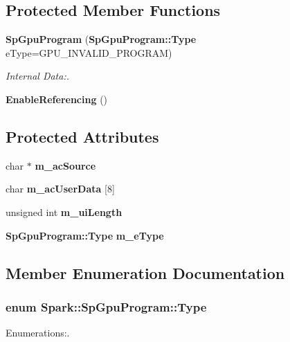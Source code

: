 \subsection*{Protected Member Functions}
\begin{CompactItemize}
\item 
{\bf Sp\-Gpu\-Program} ({\bf Sp\-Gpu\-Program::Type} e\-Type=GPU\_\-INVALID\_\-PROGRAM)
\begin{CompactList}\small\item\em Internal Data:. \item\end{CompactList}\item 
{\bf Enable\-Referencing} ()
\end{CompactItemize}
\subsection*{Protected Attributes}
\begin{CompactItemize}
\item 
char $\ast$ {\bf m\_\-ac\-Source}
\item 
char {\bf m\_\-ac\-User\-Data} [8]
\item 
unsigned int {\bf m\_\-ui\-Length}
\item 
{\bf Sp\-Gpu\-Program::Type} {\bf m\_\-e\-Type}
\end{CompactItemize}


\subsection{Member Enumeration Documentation}
\subsubsection{\setlength{\rightskip}{0pt plus 5cm}enum {\bf Spark::Sp\-Gpu\-Program::Type}}\label{classSpark_1_1SpGpuProgram_w4}


Enumerations:. 

